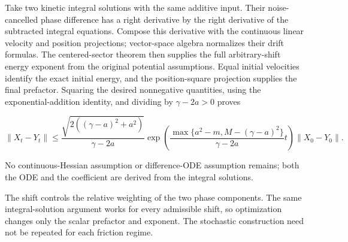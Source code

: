 \documentclass[11pt,a4paper]{article}
\begin{document}
Take two kinetic integral solutions with the same additive input. Their noise-cancelled phase difference has a right derivative by the right derivative of the subtracted integral equations. Compose this derivative with the continuous linear velocity and position projections; vector-space algebra normalizes their drift formulas. The centered-sector theorem then supplies the full arbitrary-shift energy exponent from the original potential assumptions. Equal initial velocities identify the exact initial energy, and the position-square projection supplies the final prefactor. Squaring the desired nonnegative quantities, using the exponential-addition identity, and dividing by \(\gamma-2a>0\) proves

\[\|X_t-Y_t\|\le\frac{\sqrt{2((\gamma-a)^2+a^2)}}{\gamma-2a}\exp\!\left(\frac{\max\{a^2-m,M-(\gamma-a)^2\}}{\gamma-2a}t\right)\|X_0-Y_0\|.\]

No continuous-Hessian assumption or difference-ODE assumption remains; both the ODE and the coefficient are derived from the integral solutions.



The shift controls the relative weighting of the two phase components. The same integral-solution argument works for every admissible shift, so optimization changes only the scalar prefactor and exponent. The stochastic construction need not be repeated for each friction regime.
\end{document}
